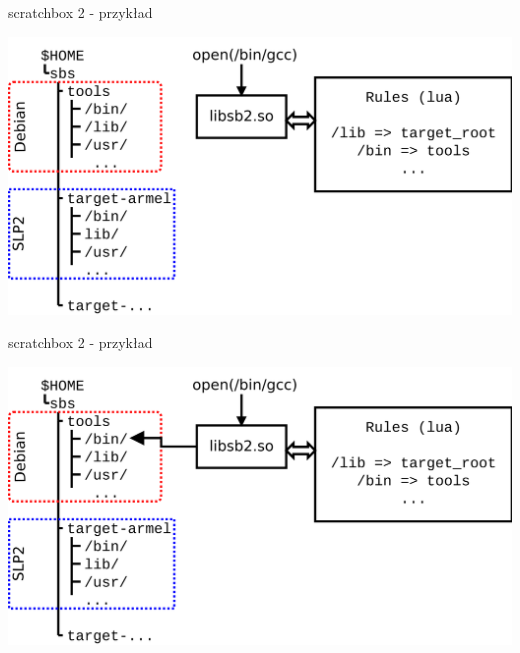 \documentclass[presentation,aspectratio=43,12pt]{beamer}
\begin{document}
\begin{frame}[label=sec-3-6]{scratchbox 2 - przykład}
\begin{center}
\includegraphics[width=\textwidth]{images/sb2-1}
\end{center}
\end{frame}
\begin{frame}[label=sec-3-7]{scratchbox 2 - przykład}
\begin{center}
\includegraphics[width=\textwidth]{images/sb2-2}
\end{center}
\end{frame}
\end{document}
